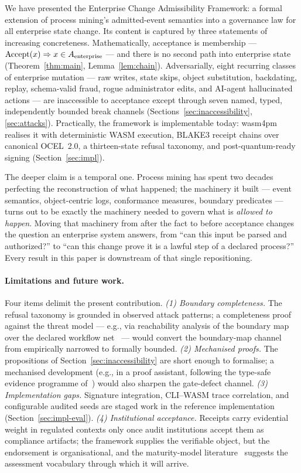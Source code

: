 We have presented the Enterprise Change Admissibility Framework: a formal
extension of process mining's admitted-event semantics into a governance law
for all enterprise state change. Its content is captured by three statements
of increasing concreteness. Mathematically, acceptance is membership ---
$\operatorname{Accept}(x) \Rightarrow x \in A_{\mathrm{enterprise}}$ --- and there is no second path into
enterprise state (Theorem~\ref{thm:main}, Lemma~\ref{lem:chain}).
Adversarially, eight recurring classes of enterprise mutation --- raw writes,
state skips, object substitution, backdating, replay, schema-valid fraud,
rogue administrator edits, and AI-agent hallucinated actions --- are
inaccessible to acceptance except through seven named, typed, independently
bounded break channels (Sections~\ref{sec:inaccessibility},
\ref{sec:attacks}). Practically, the framework is implementable today:
wasm4pm realises it with deterministic WASM execution, BLAKE3 receipt chains
over canonical OCEL~2.0, a thirteen-state refusal taxonomy, and
post-quantum-ready signing (Section~\ref{sec:impl}).

The deeper claim is a temporal one. Process mining has spent two decades
perfecting the reconstruction of what happened; the machinery it built ---
event semantics, object-centric logs, conformance measures, boundary
predicates --- turns out to be exactly the machinery needed to govern what is
\emph{allowed to happen}. Moving that machinery from after the fact to before
acceptance changes the question an enterprise system answers, from ``can this
input be parsed and authorized?'' to ``can this change prove it is a lawful
step of a declared process?'' Every result in this paper is downstream of
that single repositioning.

\paragraph{Limitations and future work.}
Four items delimit the present contribution. \emph{(1) Boundary completeness.}
The refusal taxonomy is grounded in observed attack patterns; a completeness
proof against the threat model --- e.g., via reachability analysis of the
boundary map over the declared workflow
net~\cite{van_der_aalst_wfnet_soundness_1997} --- would convert the
boundary-map channel from empirically narrowed to formally bounded.
\emph{(2) Mechanised proofs.} The propositions of
Section~\ref{sec:inaccessibility} are short enough to formalise; a mechanised
development (e.g., in a proof assistant, following the type-safe evidence
programme of~\cite{type_safe_process_evidence_2024}) would also sharpen the
gate-defect channel. \emph{(3) Implementation gaps.} Signature integration,
CLI--WASM trace correlation, and configurable audited seeds are staged work in
the reference implementation (Section~\ref{sec:impl-eval}). \emph{(4)
Institutional acceptance.} Receipts carry evidential weight in regulated
contexts only once audit institutions accept them as compliance artifacts;
the framework supplies the verifiable object, but the endorsement is
organisational, and the maturity-model
literature~\cite{sok_ccmm_2024,nist_ai_rmf_maturity_2024} suggests the
assessment vocabulary through which it will arrive.

